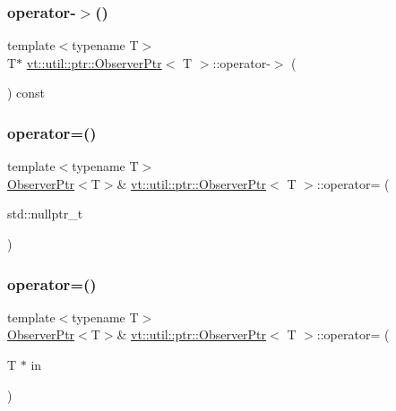\subsubsection{\texorpdfstring{operator-\/$>$()}{operator->()}}
{\footnotesize\ttfamily template$<$typename T$>$ \\
T$\ast$ \hyperlink{structvt_1_1util_1_1ptr_1_1_observer_ptr}{vt\+::util\+::ptr\+::\+Observer\+Ptr}$<$ T $>$\+::operator-\/$>$ (\begin{DoxyParamCaption}{ }\end{DoxyParamCaption}) const\hspace{0.3cm}{\ttfamily [inline]}}

\mbox{\label{structvt_1_1util_1_1ptr_1_1_observer_ptr_a1e4b2d8b7fa49ddbba59b5d2516b0317}} 
\subsubsection{\texorpdfstring{operator=()}{operator=()}\hspace{0.1cm}{\footnotesize\ttfamily [1/3]}}
{\footnotesize\ttfamily template$<$typename T$>$ \\
\hyperlink{structvt_1_1util_1_1ptr_1_1_observer_ptr}{Observer\+Ptr}$<$T$>$\& \hyperlink{structvt_1_1util_1_1ptr_1_1_observer_ptr}{vt\+::util\+::ptr\+::\+Observer\+Ptr}$<$ T $>$\+::operator= (\begin{DoxyParamCaption}\item[{std\+::nullptr\+\_\+t}]{ }\end{DoxyParamCaption})\hspace{0.3cm}{\ttfamily [inline]}}

\mbox{\label{structvt_1_1util_1_1ptr_1_1_observer_ptr_a8134934d20910965a81a9dd65b40ed5a}} 
\subsubsection{\texorpdfstring{operator=()}{operator=()}\hspace{0.1cm}{\footnotesize\ttfamily [2/3]}}
{\footnotesize\ttfamily template$<$typename T$>$ \\
\hyperlink{structvt_1_1util_1_1ptr_1_1_observer_ptr}{Observer\+Ptr}$<$T$>$\& \hyperlink{structvt_1_1util_1_1ptr_1_1_observer_ptr}{vt\+::util\+::ptr\+::\+Observer\+Ptr}$<$ T $>$\+::operator= (\begin{DoxyParamCaption}\item[{T $\ast$}]{in }\end{DoxyParamCaption})\hspace{0.3cm}{\ttfamily [inline]}}

